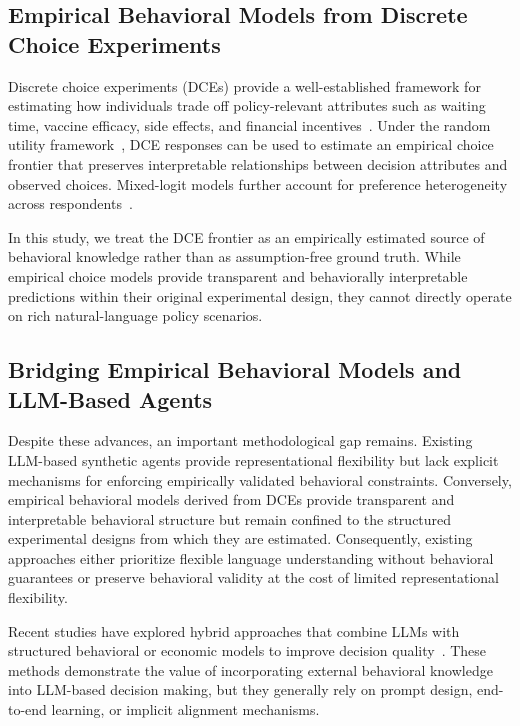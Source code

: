 \documentclass[11pt]{article}
\begin{document}
\subsection{Empirical Behavioral Models from Discrete Choice Experiments}

Discrete choice experiments (DCEs) provide a well-established framework for estimating how individuals trade off policy-relevant attributes such as waiting time, vaccine efficacy, side effects, and financial incentives~\citep{Hauber2016, soekhai2019discrete, chan2024vaccine}. Under the random utility framework~\citep{train2009discrete, louviere2000stated}, DCE responses can be used to estimate an empirical choice frontier that preserves interpretable relationships between decision attributes and observed choices. Mixed-logit models further account for preference heterogeneity across respondents~\citep{hensher2003mixed, hensher2015applied}.

In this study, we treat the DCE frontier as an empirically estimated source of behavioral knowledge rather than as assumption-free ground truth. While empirical choice models provide transparent and behaviorally interpretable predictions within their original experimental design, they cannot directly operate on rich natural-language policy scenarios.

\subsection{Bridging Empirical Behavioral Models and LLM-Based Agents}

Despite these advances, an important methodological gap remains. Existing LLM-based synthetic agents provide representational flexibility but lack explicit mechanisms for enforcing empirically validated behavioral constraints\citep{li2026position, tornberg2025validation}. Conversely, empirical behavioral models derived from DCEs provide transparent and interpretable behavioral structure but remain confined to the structured experimental designs from which they are estimated. Consequently, existing approaches either prioritize flexible language understanding without behavioral guarantees or preserve behavioral validity at the cost of limited representational flexibility.

Recent studies have explored hybrid approaches that combine LLMs with structured behavioral or economic models to improve decision quality~\citep{sfeir2025assist, zhang2026agentic, Yang2025b}. These methods demonstrate the value of incorporating external behavioral knowledge into LLM-based decision making, but they generally rely on prompt design, end-to-end learning, or implicit alignment mechanisms.
\end{document}
